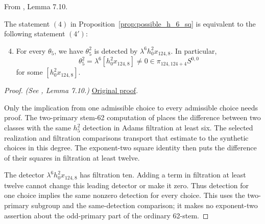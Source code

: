 \begin{lemma}[Independence of the theta choice]
\label{paper:7.10}
From \cite{LWX126}, Lemma 7.10.\par
\label{lem:equistate4}
    The statement $(4)$ in Proposition~\ref{prop:possible_h_6_sq} is equivalent to the following statement $(4')$:
    \begin{enumerate}[label=(\arabic*')]\setcounter{enumi}{3}
    \item For every $\theta_5$, we have $\theta_5^2$ is detected by $\lambda^6 h_0^2x_{124,8}$. In particular,
    $$\theta_5^2 = \lambda^6 [h_0^2x_{124,8}] \neq 0 \in \pi_{124,124+4}S^{0,0}$$
    for some $[h_0^2x_{124,8}]$.
    \end{enumerate}


\end{lemma}
\begin{proof}
\textit{(See \cite{LWX126}, Lemma 7.10.)} \href{paper/main.tex.html#L2230}{Original proof}.

Only the implication from one admissible choice to every admissible choice needs proof. The two-primary stem-62 computation of \cite{IWX} places the difference between two classes with the same $h_5^2$ detection in Adams filtration at least six. The selected realization and filtration comparisons transport that estimate to the synthetic choices in this degree. The exponent-two square identity then puts the difference of their squares in filtration at least twelve.

The detector $\lambda^6h_0^2x_{124,8}$ has filtration ten. Adding a term in filtration at least twelve cannot change this leading detector or make it zero. Thus detection for one choice implies the same nonzero detection for every choice. This uses the two-primary subgroup and the same-detection comparison; it makes no exponent-two assertion about the odd-primary part of the ordinary 62-stem.
\end{proof}

